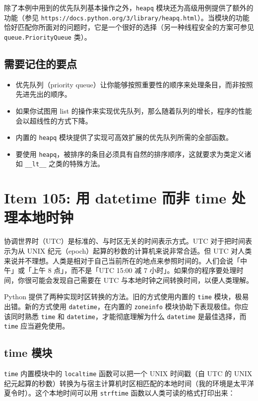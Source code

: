 除了本例中用到的优先队列基本操作之外，\texttt{heapq} 模块还为高级用例提供了额外的功能（参见 \texttt{https://docs.python.org/3/library/heapq.html}）。当模块的功能恰好匹配你所面对的问题时，它是一个很好的选择（另一种线程安全的方案可参见 \texttt{queue.PriorityQueue} 类）。

\subsection{需要记住的要点}

\begin{itemize}
\item 优先队列（priority queue）让你能够按照重要性的顺序来处理条目，而非按照先进先出的顺序。
\item 如果你试图用 list 的操作来实现优先队列，那么随着队列的增长，程序的性能会以超线性的方式下降。
\item 内置的 \texttt{heapq} 模块提供了实现可高效扩展的优先队列所需的全部函数。
\item 要使用 \texttt{heapq}，被排序的条目必须具有自然的排序顺序，这就要求为类定义诸如 \texttt{\_\_lt\_\_} 之类的特殊方法。
\end{itemize}

\section{Item 105: 用 datetime 而非 time 处理本地时钟}

协调世界时（UTC）是标准的、与时区无关的时间表示方式。UTC 对于把时间表示为从 UNIX 纪元（epoch）起算的秒数的计算机来说非常合适。但 UTC 对人类来说并不理想。人类是相对于自己当前所在的地点来参照时间的。人们会说「中午」或「上午 8 点」，而不是「UTC 15:00 减 7 小时」。如果你的程序要处理时间，你很可能会发现自己需要在 UTC 与本地时钟之间转换时间，以便人类理解。

Python 提供了两种实现时区转换的方法。旧的方式使用内置的 \texttt{time} 模块，极易出错。新的方式使用 \texttt{datetime}，在内置的 \texttt{zoneinfo} 模块协助下表现极佳。你应该同时熟悉 \texttt{time} 和 \texttt{datetime}，才能彻底理解为什么 \texttt{datetime} 是最佳选择，而 \texttt{time} 应当避免使用。

\subsection{time 模块}

\texttt{time} 内置模块中的 \texttt{localtime} 函数可以把一个 UNIX 时间戳（自 UTC 的 UNIX 纪元起算的秒数）转换为与宿主计算机时区相匹配的本地时间（我的环境是太平洋夏令时）。这个本地时间可以用 \texttt{strftime} 函数以人类可读的格式打印出来：

